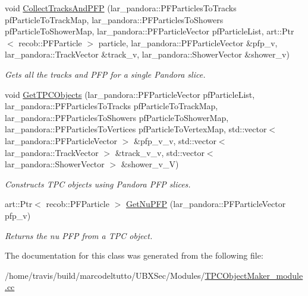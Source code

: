\begin{DoxyCompactItemize}
\item 
void \hyperlink{group__UBXSec_gafb413d9b6e9949b0048d53244d2f8a0a}{\-Collect\-Tracks\-And\-P\-F\-P} (lar\-\_\-pandora\-::\-P\-F\-Particles\-To\-Tracks pf\-Particle\-To\-Track\-Map, lar\-\_\-pandora\-::\-P\-F\-Particles\-To\-Showers pf\-Particle\-To\-Shower\-Map, lar\-\_\-pandora\-::\-P\-F\-Particle\-Vector pf\-Particle\-List, art\-::\-Ptr$<$ recob\-::\-P\-F\-Particle $>$ particle, lar\-\_\-pandora\-::\-P\-F\-Particle\-Vector \&pfp\-\_\-v, lar\-\_\-pandora\-::\-Track\-Vector \&track\-\_\-v, lar\-\_\-pandora\-::\-Shower\-Vector \&shower\-\_\-v)
\begin{DoxyCompactList}\small\item\em \-Gets all the tracks and \-P\-F\-P for a single \-Pandora slice. \end{DoxyCompactList}\item 
void \hyperlink{group__UBXSec_ga2d662daa2dadce6b372347f0aa4dd734}{\-Get\-T\-P\-C\-Objects} (lar\-\_\-pandora\-::\-P\-F\-Particle\-Vector pf\-Particle\-List, lar\-\_\-pandora\-::\-P\-F\-Particles\-To\-Tracks pf\-Particle\-To\-Track\-Map, lar\-\_\-pandora\-::\-P\-F\-Particles\-To\-Showers pf\-Particle\-To\-Shower\-Map, lar\-\_\-pandora\-::\-P\-F\-Particles\-To\-Vertices pf\-Particle\-To\-Vertex\-Map, std\-::vector$<$ lar\-\_\-pandora\-::\-P\-F\-Particle\-Vector $>$ \&pfp\-\_\-v\-\_\-v, std\-::vector$<$ lar\-\_\-pandora\-::\-Track\-Vector $>$ \&track\-\_\-v\-\_\-v, std\-::vector$<$ lar\-\_\-pandora\-::\-Shower\-Vector $>$ \&shower\-\_\-v\-\_\-\-V)
\begin{DoxyCompactList}\small\item\em \-Constructs \-T\-P\-C objects using \-Pandora \-P\-F\-P slices. \end{DoxyCompactList}\item 
art\-::\-Ptr$<$ recob\-::\-P\-F\-Particle $>$ \hyperlink{group__UBXSec_ga6a47470b5f5690a3626e14bc9f6f360c}{\-Get\-Nu\-P\-F\-P} (lar\-\_\-pandora\-::\-P\-F\-Particle\-Vector pfp\-\_\-v)
\begin{DoxyCompactList}\small\item\em \-Returns the nu \-P\-F\-P from a \-T\-P\-C object. \end{DoxyCompactList}\end{DoxyCompactItemize}


\-The documentation for this class was generated from the following file\-:\begin{DoxyCompactItemize}
\item 
/home/travis/build/marcodeltutto/\-U\-B\-X\-Sec/\-Modules/\hyperlink{TPCObjectMaker__module_8cc}{\-T\-P\-C\-Object\-Maker\-\_\-module.\-cc}\end{DoxyCompactItemize}
